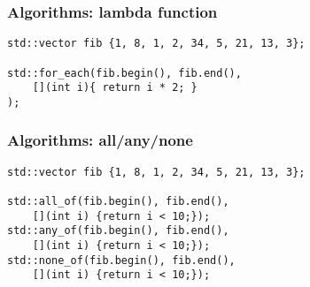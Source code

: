 
\begin{frame}[fragile]
    \frametitle{Algorithms: lambda function}
    \begin{lstlisting}[numbers=none]
std::vector fib {1, 8, 1, 2, 34, 5, 21, 13, 3};

std::for_each(fib.begin(), fib.end(),
    [](int i){ return i * 2; }
);
    \end{lstlisting}
\end{frame}

\begin{frame}[fragile]
    \frametitle{Algorithms: all/any/none}
    \begin{lstlisting}[numbers=none]
std::vector fib {1, 8, 1, 2, 34, 5, 21, 13, 3};

std::all_of(fib.begin(), fib.end(),
    [](int i) {return i < 10;});
std::any_of(fib.begin(), fib.end(),
    [](int i) {return i < 10;});
std::none_of(fib.begin(), fib.end(),
    [](int i) {return i < 10;});
    \end{lstlisting}
\end{frame}


